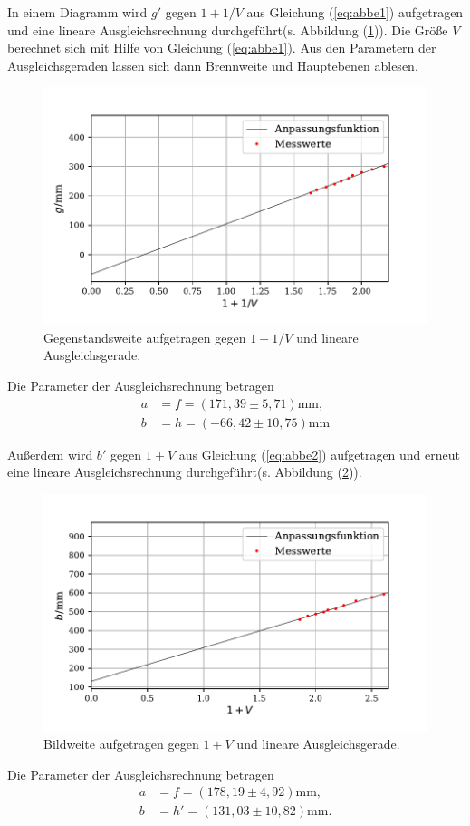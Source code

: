 In einem Diagramm wird $g'$ gegen $1+1/V$ aus Gleichung (\ref{eq:abbe1}) aufgetragen und eine lineare Ausgleichsrechnung durchgeführt(s. Abbildung (\ref{fig:plot2})). Die Größe $V$ berechnet sich mit Hilfe von Gleichung (\ref{eq:abbe1}).
Aus den Parametern der Ausgleichsgeraden lassen sich dann Brennweite und Hauptebenen ablesen.
\begin{figure}[H]
  \centering
  \includegraphics{plot2.pdf}
  \caption{Gegenstandsweite aufgetragen gegen $1+1/V$ und lineare Ausgleichsgerade.}
  \label{fig:plot2}
\end{figure}
Die Parameter der Ausgleichsrechnung betragen
\begin{align*}
a &= f = (171,39 \pm 5,71)\si{\milli\meter},\\
b &= h = (-66,42\pm 10,75)\si{\milli\meter}
\end{align*}


\noindent Außerdem wird $b'$ gegen $1+V$ aus Gleichung (\ref{eq:abbe2}) aufgetragen und erneut eine lineare Ausgleichsrechnung durchgeführt(s. Abbildung (\ref{fig:plot3})).
\begin{figure}[H]
  \centering
  \includegraphics{plot3.pdf}
  \caption{Bildweite aufgetragen gegen $1+V$ und lineare Ausgleichsgerade.}
  \label{fig:plot3}
\end{figure}
Die Parameter der Ausgleichsrechnung betragen
\begin{align*}
a &= f = (178,19 \pm 4,92)\si{\milli\meter},\\
b &= h'= (131,03\pm 10,82)\si{\milli\meter}.
\end{align*}

